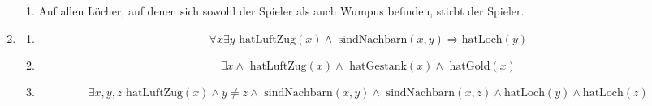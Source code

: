 \documentclass[a4paper]{article}
\begin{document}
\begin{enumerate}
\begin{enumerate}
			\item
			Auf allen Löcher, auf denen sich sowohl der Spieler als auch Wumpus befinden, stirbt der Spieler.
		\end{enumerate}
		
		\item
		\begin{enumerate}
			\item
			\begin{equation*}
				\forall x \exists y \text{ hatLuftZug}(x) \land \text{ sindNachbarn}(x, y) \Rightarrow \text{hatLoch}(y)
			\end{equation*}
			
			\item
			\begin{equation*}
				\exists x \land \text{ hatLuftZug}(x) \land \text{ hatGestank}(x) \land \text{ hatGold}(x)
			\end{equation*}
			
			\item
			\begin{equation*}
				\exists x, y, z \text{ hatLuftZug}(x) \land y \neq z \land \text{ sindNachbarn}(x, y) \land \text{ sindNachbarn}(x, z) \land \text{hatLoch}(y) \land \text{hatLoch}(z)
			\end{equation*}
		\end{enumerate}
	\end{enumerate}
\end{document}
